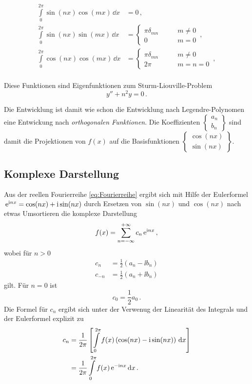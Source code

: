 \documentclass[paper=a4, fontsize=11.0pt, abstractoff, DIV12]{scrartcl}
\begin{document}
\begin{align}
\int\limits_{0}^{2\pi} \sin(nx)\cos(mx)\,\dd x&=0\,,\\
\int\limits_{0}^{2\pi} \sin(nx)\sin(mx)\,\dd x &= \left\{\begin{array}{lr}\pi\delta_{mn}&\qquad m\ne 0\\0&\qquad m=0\end{array}\right.\,,\\
\int\limits_{0}^{2\pi} \cos(nx)\cos(mx)\,\dd x&= \left\{\begin{array}{lr}\pi\delta_{mn}&\qquad m\ne 0\\2\pi&\qquad m=n=0\end{array}\right.\,,\\
\end{align}

Diese Funktionen sind Eigenfunktionen zum Sturm-Liouville-Problem
\begin{equation*}
y'' + n^2 y = 0\,.
\end{equation*}

Die Entwicklung ist damit wie schon die Entwicklung nach Legendre-Polynomen
eine Entwickung nach \emph{orthogonalen Funktionen}. Die Koeffizienten
$\left\{\begin{array}{c}a_n\\b_n\end{array}\right\}$ sind damit die
Projektionen von $f(x)$ auf die Basisfunktionen
$\left\{\begin{array}{c}\cos(nx)\\\sin(nx)\end{array}\right\}$.

\subsection{Komplexe Darstellung}

Aus der reellen Fourierreihe \eqref{eq:Fourierreihe} ergibt sich mit Hilfe der
Eulerformel $\,{\mathrm{e}}^{\mathrm{i} nx} = \cos(nx)+\mathrm{i}\sin(nx)$ durch Ersetzen von $\sin(nx)$
und $\cos(nx)$ nach etwas Umsortieren die komplexe Darstellung
\begin{equation}
f(x) = \sum\limits_{n=-\infty}^{+\infty}c_n\,{\mathrm{e}}^{\mathrm{i} nx}\,,
\end{equation}
wobei für $n> 0$
\begin{align}
c_n &= \frac{1}{2}(a_n - \ii b_n)\\
c_{-n} &= \frac{1}{2}(a_n + \ii b_n)
\end{align}
gilt. Für $n=0$ ist
\begin{equation}
c_0 = \frac{1}{2}a_0\,.
\end{equation}
Die Formel für $c_n$ ergibt sich unter der Verwenug der Linearität des
Integrals und der Eulerformel explizit zu
\begin{align}
c_n &= \frac{1}{2\pi}\left[ \int\limits_{0}^{2\pi} f(x)\left(\cos(nx) - \mathrm{i} \sin(nx)\right)\,\mathrm{d} x\right]\nonumber\\
&=\frac{1}{2\pi}\int\limits_{0}^{2\pi} f(x) \,{\mathrm{e}}^{-\mathrm{i} nx}\,\mathrm{d} x\, .
\label{eq:cn}
\end{align}
\end{document}
